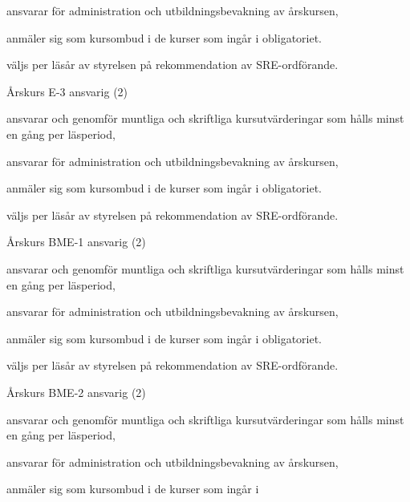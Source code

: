 \documentclass[10pt]{article}
\begin{document}
\begin{emptylist}
\begin{dashlist}
            \item ansvarar för administration och utbildningsbevakning av
                årskursen,
            \item anmäler sig som kursombud i de kurser som ingår i
                obligatoriet.
              \item väljs per läsår av styrelsen på rekommendation av SRE-ordförande.
        \end{dashlist}
    \item Årskurs E-3 ansvarig (2)
        \begin{dashlist}
            \item ansvarar och genomför muntliga och skriftliga
                kursutvärderingar som hålls minst en gång per läsperiod,
            \item ansvarar för administration och utbildningsbevakning av
                årskursen,
            \item anmäler sig som kursombud i de kurser som ingår i
                obligatoriet.
             \item väljs per läsår av styrelsen på rekommendation av SRE-ordförande.
        \end{dashlist}
    \item Årskurs BME-1 ansvarig (2)
        \begin{dashlist}
            \item ansvarar och genomför muntliga och skriftliga
                kursutvärderingar som hålls minst en gång per läsperiod,
            \item ansvarar för administration och utbildningsbevakning av
                årskursen,
            \item anmäler sig som kursombud i de kurser som ingår i
                obligatoriet.
              \item väljs per läsår av styrelsen på rekommendation av SRE-ordförande.
        \end{dashlist}
    \item Årskurs BME-2 ansvarig (2)
        \begin{dashlist}
            \item ansvarar och genomför muntliga och skriftliga
                kursutvärderingar som hålls minst en gång per läsperiod,
            \item ansvarar för administration och utbildningsbevakning av
                årskursen,
            \item anmäler sig som kursombud i de kurser som ingår i

\end{dashlist}
\end{emptylist}
\end{document}
